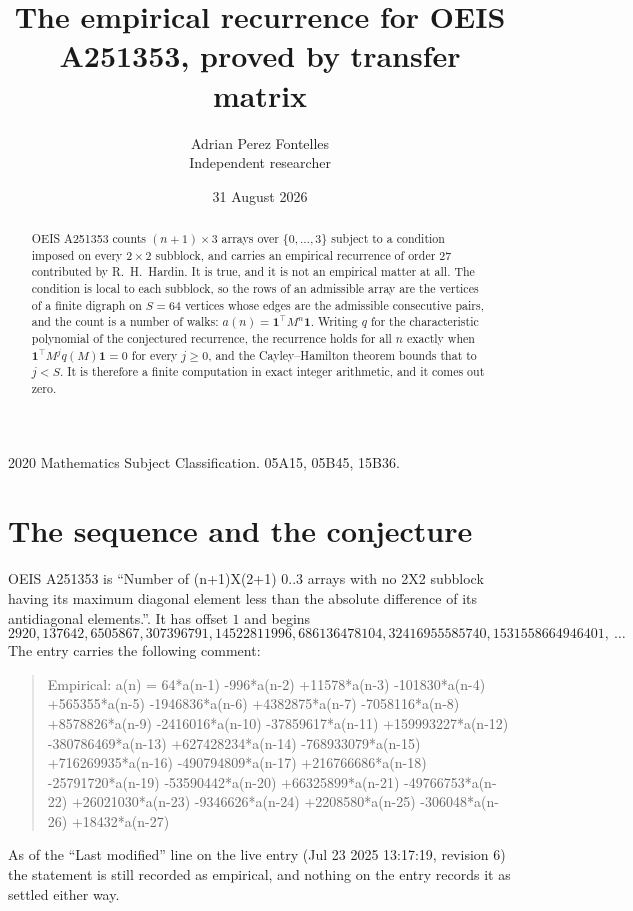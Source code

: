 \documentclass[11pt,a4paper]{article}
\title{The empirical recurrence for OEIS A251353, proved by transfer matrix}
\author{Adrian Perez Fontelles\\ \small Independent researcher}
\date{31 August 2026}
\theoremstyle{plain}
\theoremstyle{definition}
\begin{document}
\maketitle

\begin{abstract}
OEIS A251353 counts $(n+1)\times3$ arrays over $\{0,\dots,3\}$ subject to a condition imposed on
every $2\times2$ subblock, and carries an empirical recurrence of order $27$ contributed
by R.~H.~Hardin. It is true, and it is not an empirical matter at all. The condition is local
to each subblock, so the rows of an admissible array are the vertices of a finite digraph
on $S=64$ vertices whose edges are the admissible consecutive pairs, and the count is a
number of walks: $a(n)=\mathbf{1}^{\!\top}M^{n}\mathbf{1}$. Writing $q$
for the characteristic polynomial of the conjectured recurrence, the recurrence holds for all
$n$ exactly when $\mathbf{1}^{\!\top}M^{j}q(M)\mathbf{1}=0$ for every $j\ge0$, and the
Cayley--Hamilton theorem bounds that to $j<S$. It is therefore a finite computation in exact
integer arithmetic, and it comes out zero.
\end{abstract}

\noindent\small 2020 Mathematics Subject Classification. 05A15, 05B45, 15B36.\normalsize

\section{The sequence and the conjecture}

OEIS A251353 is ``Number of (n+1)X(2+1) 0..3 arrays with no 2X2 subblock having its maximum diagonal element less than the absolute difference of its antidiagonal elements.''. It has offset $1$ and begins
\[
2920, 137642, 6505867, 307396791, 14522811996, 686136478104, 32416955585740, 1531558664946401,\ \dots
\]
The entry carries the following comment:
\begin{quote}\small
Empirical: a(n) = 64*a(n-1) -996*a(n-2) +11578*a(n-3) -101830*a(n-4) +565355*a(n-5) -1946836*a(n-6) +4382875*a(n-7) -7058116*a(n-8) +8578826*a(n-9) -2416016*a(n-10) -37859617*a(n-11) +159993227*a(n-12) -380786469*a(n-13) +627428234*a(n-14) -768933079*a(n-15) +716269935*a(n-16) -490794809*a(n-17) +216766686*a(n-18) -25791720*a(n-19) -53590442*a(n-20) +66325899*a(n-21) -49766753*a(n-22) +26021030*a(n-23) -9346626*a(n-24) +2208580*a(n-25) -306048*a(n-26) +18432*a(n-27)
\end{quote}
As of the ``Last modified'' line on the live entry (Jul 23 2025 13:17:19, revision 6) the statement is
still recorded as empirical, and nothing on the entry records it as settled either way.
\end{document}
